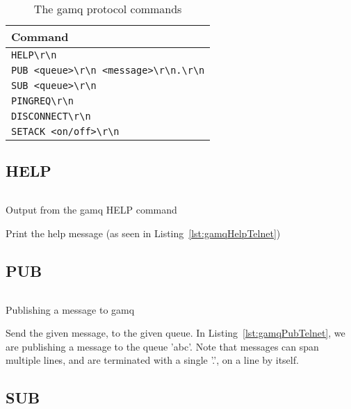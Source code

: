 \begin{table}[H]
\centering
\caption{The gamq protocol commands}
\label{tab:protocol}
\begin{tabular}{|l|}
\hline
Command \\ \hline
\verb|HELP\r\n|                           \\
\verb|PUB <queue>\r\n <message>\r\n.\r\n| \\
\verb|SUB <queue>\r\n|                    \\
\verb|PINGREQ\r\n|                        \\
\verb|DISCONNECT\r\n|                     \\
\verb|SETACK <on/off>\r\n|                \\ \hline
\end{tabular}
\end{table}

\subsection{HELP}
\label{sub:helpCommand}

\begin{listing}[H]
  \centering
  \inputminted{bash}{code/gamqHelpOutputTelnet}
  \caption{Output from the gamq HELP command}
  \label{lst:gamqHelpTelnet}
\end{listing}

Print the help message (as seen in Listing~\ref{lst:gamqHelpTelnet})

\subsection{PUB}
\label{sub:pubCommand}

\begin{listing}[H]
  \centering
  \inputminted{bash}{code/gamqPubOutput}
  \caption{Publishing a message to gamq}
  \label{lst:gamqPubTelnet}
\end{listing}

Send the given message, to the given queue. In Listing~\ref{lst:gamqPubTelnet},
we are publishing a message to the queue 'abc'. Note that messages can span
multiple lines, and are terminated with a single '.', on a line by itself.

\subsection{SUB}
\label{sub:subCommand}

